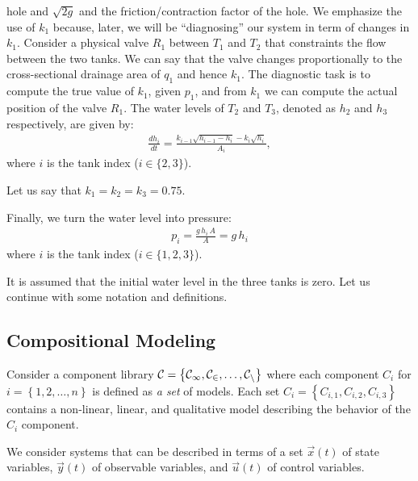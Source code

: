 hole and $\sqrt{2g}$ and the friction/contraction factor of the
hole. We emphasize the use of $k_1$ because, later, we will be
``diagnosing'' our system in term of changes in $k_1$. Consider a
physical valve $R_1$ between $T_1$ and $T_2$ that constraints the flow
between the two tanks. We can say that the valve changes
proportionally to the cross-sectional drainage area of $q_1$ and hence
$k_1$. The diagnostic task is to compute the true value of $k_1$,
given $p_1$, and from $k_1$ we can compute the actual position of the
valve $R_1$.
%
The water levels of $T_2$ and $T_3$, denoted as $h_2$ and $h_3$
respectively, are given by:
%
\begin{eqnarray}\label{eq:tank1}
%
\frac{d h_i}{dt} = \frac{k_{i - 1} \sqrt{h_{i - 1} - h_i} - k_i \sqrt{h_i}}{A_i},
%
\end{eqnarray}
%
where $i$ is the tank index ($i \in \{2, 3\}$).
\par
Let us say that $k_1 = k_2 = k_3 = 0.75$.
\par
Finally, we turn the water level into pressure:
\begin{eqnarray}
p_i = \frac{g\,h_i\,A}{A} = g\,h_i\label{eq:pressure}
\end{eqnarray}
where $i$ is the tank index ($i \in \{1, 2, 3\}$).
\par
It is assumed that the initial water level in the three tanks is zero.
%
Let us continue with some notation and definitions.
%
\subsection{Compositional Modeling}
%
Consider a component library $\cal{C} = \left\{C_1, C_2, \ldots,
C_n\right\}$ where each component $C_i$ for $i = \left\{1, 2, \ldots,
n\right\}$ is defined as \textit{a set} of models. Each set $C_i =
\left\{C_{i, 1}, C_{i, 2}, C_{i, 3}\right\}$ contains a non-linear,
linear, and qualitative model describing the behavior of the $C_i$
component.

We consider systems that can be described in terms of a set
${\vec{x}}(t)$ of state variables, $\vec{y}(t)$ of observable variables,
and $\vec{u}(t)$ of control variables.

